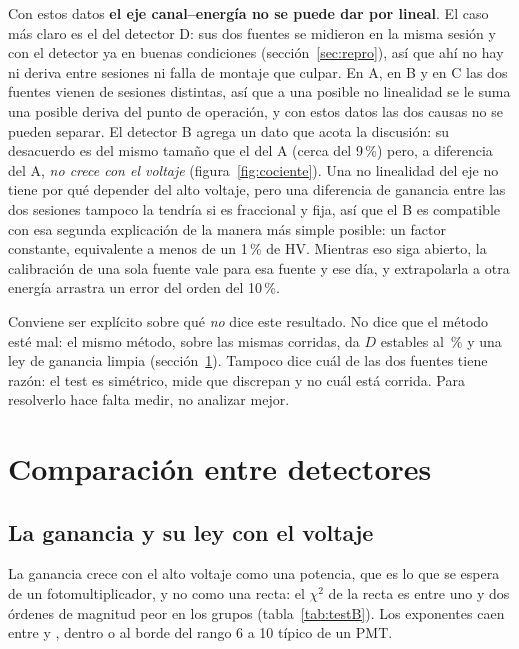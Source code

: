 \documentclass[11pt,a4paper]{article}
\begin{document}
Con estos datos \textbf{el eje canal--energía no se puede dar por lineal}. El
caso más claro es el del detector D: sus dos fuentes se midieron en la misma
sesión y con el detector ya en buenas condiciones (sección~\ref{sec:repro}), así
que ahí no hay ni deriva entre sesiones ni falla de montaje que culpar. En A,
en B y en C las dos fuentes vienen de sesiones distintas, así que a una posible
no linealidad se le suma una posible deriva del punto de operación, y con estos
datos las dos causas no se pueden separar. El detector B agrega un dato que
acota la discusión: su desacuerdo es del mismo tamaño que el del A (cerca del
9\,\%) pero, a diferencia del A, \emph{no crece con el voltaje}
(figura~\ref{fig:cociente}). Una no linealidad del eje no tiene por qué
depender del alto voltaje, pero una diferencia de ganancia entre las dos
sesiones tampoco la tendría si es fraccional y fija, así que el B es
compatible con esa segunda explicación de la manera más simple posible: un
factor constante, equivalente a menos de un 1\,\% de HV. Mientras eso siga abierto, la
calibración de una sola fuente vale para esa fuente y ese día, y extrapolarla
a otra energía arrastra un error del orden del 10\,\%.

\begin{aviso}
Conviene ser explícito sobre qué \emph{no} dice este resultado. No dice que el
método esté mal: el mismo método, sobre las mismas corridas, da $D$ estables
al \ErrRelMediano\,\% y una ley de ganancia limpia (sección~\ref{sec:detectores}).
Tampoco dice cuál de las dos fuentes tiene razón: el test es simétrico, mide
que discrepan y no cuál está corrida. Para resolverlo hace falta medir, no
analizar mejor.
\end{aviso}

\section{Comparación entre detectores}
\label{sec:detectores}

\subsection{La ganancia y su ley con el voltaje}

La ganancia crece con el alto voltaje como una potencia, que es lo que se
espera de un fotomultiplicador, y no como una recta: el $\chi^2$ de la recta es
entre uno y dos órdenes de magnitud peor en los \NGruposTestB{} grupos
(tabla~\ref{tab:testB}). Los exponentes caen entre \BMin{} y \BMax{}, dentro o
al borde del rango 6 a 10 típico de un PMT.
\end{document}
